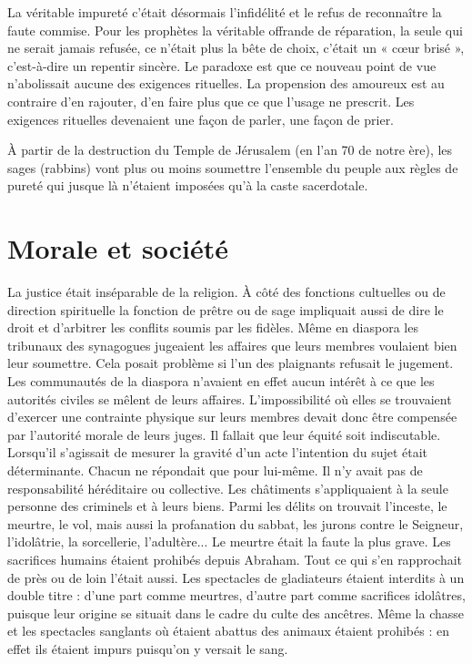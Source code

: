  La véritable impureté c'était désormais l'infidélité et le refus de reconnaître la faute commise. Pour les prophètes la véritable offrande de réparation, la seule qui ne serait jamais refusée, ce n'était plus la bête de choix, c'était un « cœur brisé », c'est-à-dire un repentir sincère. Le paradoxe est que ce nouveau point de vue n'abolissait aucune des exigences rituelles. La propension des amoureux est au contraire d'en rajouter, d'en faire plus que ce que l'usage ne prescrit. Les exigences rituelles devenaient une façon de parler, une façon de prier. 

 À partir de la destruction du Temple de Jérusalem (en l'an 70 de notre ère), les sages (rabbins) vont plus ou moins soumettre l'ensemble du peuple aux règles de pureté qui jusque là n'étaient imposées qu'à la caste sacerdotale.


\section{Morale et société}

 La justice était inséparable de la religion. À côté des fonctions cultuelles ou de direction spirituelle la fonction de prêtre ou de sage impliquait aussi de dire le droit et d'arbitrer les conflits soumis par les fidèles. Même en diaspora les tribunaux des synagogues jugeaient les affaires que leurs membres voulaient bien leur soumettre. Cela posait problème si l'un des plaignants refusait le jugement. Les communautés de la diaspora n'avaient en effet aucun intérêt à ce que les autorités civiles se mêlent de leurs affaires. L'impossibilité où elles se trouvaient d'exercer une contrainte physique sur leurs membres devait donc être compensée par l'autorité morale de leurs juges. Il fallait que leur équité soit indiscutable. Lorsqu'il s'agissait de mesurer la gravité d'un acte l'intention du sujet était déterminante. Chacun ne répondait que pour lui-même. Il n'y avait pas de responsabilité héréditaire ou collective. Les châtiments s'appliquaient à la seule personne des criminels et à leurs biens. Parmi les délits on trouvait l'inceste, le meurtre, le vol, mais aussi la profanation du sabbat, les jurons contre le Seigneur, l'idolâtrie, la sorcellerie, l'adultère... Le meurtre était la faute la plus grave. Les sacrifices humains étaient prohibés depuis Abraham. Tout ce qui s'en rapprochait de près ou de loin l'était aussi. Les spectacles de gladiateurs étaient interdits à un double titre : d'une part comme meurtres, d'autre part comme sacrifices idolâtres, puisque leur origine se situait dans le cadre du culte des ancêtres. Même la chasse et les spectacles sanglants où étaient abattus des animaux étaient prohibés : en effet ils étaient impurs puisqu'on y versait le sang. 

